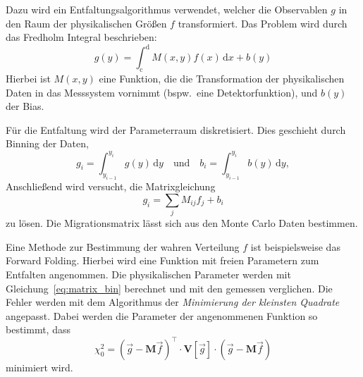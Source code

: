 
Dazu wird ein
Entfaltungsalgorithmus verwendet,
welcher die Observablen $g$
in den Raum der physikalischen Größen $f$ transformiert.
Das Problem wird durch das Fredholm Integral beschrieben:
\begin{equation}
	g(y) = \int_\text{c}^\text{d} M(x,y) f(x) \, \text{d}x + b(y)
\end{equation}
Hierbei ist $M(x, y)$ eine Funktion, die die Transformation der physikalischen
Daten in das Messsystem vornimmt (bspw.\ eine Detektorfunktion), und $b(y)$ der Bias.

Für die Entfaltung wird der Parameterraum diskretisiert.
Dies geschieht durch Binning der Daten,
\begin{equation}
	g_i = \int_{y_{i-1}}^{y_i} g(y) \, \text{d}y \quad \text{und} \quad
	b_i = \int_{y_{i-1}}^{y_i} b(y) \, \text{d}y,
\end{equation}
Anschließend wird versucht, die Matrixgleichung
\begin{equation}
	g_i = \sum_j M_{ij} f_j + b_i
    \label{eq:matrix_bin}
\end{equation}
zu lösen.
Die Migrationsmatrix lässt sich aus den Monte Carlo Daten
bestimmen.

Eine Methode zur Bestimmung der wahren Verteilung $f$ ist
beispielsweise das Forward Folding.
Hierbei wird eine Funktion mit freien Parametern zum Entfalten angenommen.
Die physikalischen Parameter werden mit Gleichung~\eqref{eq:matrix_bin}
berechnet und mit den gemessen verglichen.
Die Fehler werden mit dem Algorithmus der
\textit{Minimierung der kleinsten Quadrate}
angepasst.
Dabei werden die Parameter der angenommenen Funktion so bestimmt, dass
\begin{equation}
    \chi^2_0 = {\left( \vec{g} - \mathbf{M} \vec{f} \right)}^\intercal
        \cdot \mathbf{V} \left[ \vec{g} \right] \cdot
        \left( \vec{g} - \mathbf{M} \vec{f} \right)
\end{equation}
minimiert wird.

